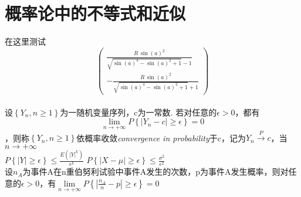 \documentclass{report}
\newcommand{\xkuo}[1]{\left(#1\right)}
\newcommand{\dkuo}[1]{\left\lbrace#1\right\rbrace}
\newcommand{\abs}[1]{\left|#1\right|}
\begin{document}
	\section{概率论中的不等式和近似}
	在这里测试\[\left(\begin{array}{c} \frac{R\, {\sin\!\left(a\right)}^2}{\sqrt{{\sin\!\left(a\right)}^4 - {\sin\!\left(a\right)}^2 + 1} - 1}\\ -\frac{R\, {\sin\!\left(a\right)}^2}{\sqrt{{\sin\!\left(a\right)}^4 - {\sin\!\left(a\right)}^2 + 1} + 1} \end{array}\right)\]
	\\
	设\(\dkuo{Y_n, n\geq 1}\)为一随机变量序列，c为一常数. 若对任意的\(\epsilon >0\)，都有\[\lim\limits_{n\rightarrow +\infty}P\dkuo{\abs{Y_n-c}\geq\epsilon}=0\]，则称\(\dkuo{Y_n, n\geq 1}\)依概率收敛\textit{convergence in probability}于c，记为\(Y_n\xrightarrow{P}c\)，当\(n\rightarrow +\infty\)\\
	\(P\dkuo{\abs{Y}\geqslant\epsilon}\leqslant\frac{E\xkuo{\abs{Y}^k}}{\epsilon^k}\)
	\(P\dkuo{\abs{X-\mu}\geqslant\epsilon}\leqslant\frac{\sigma^2}{\epsilon^2}\)\\
	设\(n_A\)为事件A在n重伯努利试验中事件A发生的次数，p为事件A发生概率，则对任意的\(\epsilon >0\)，有\(\lim\limits_{n\rightarrow+\infty}P\dkuo{\abs{\frac{n_A}{n}-p}\geqslant\epsilon}=0\)
\end{document}
